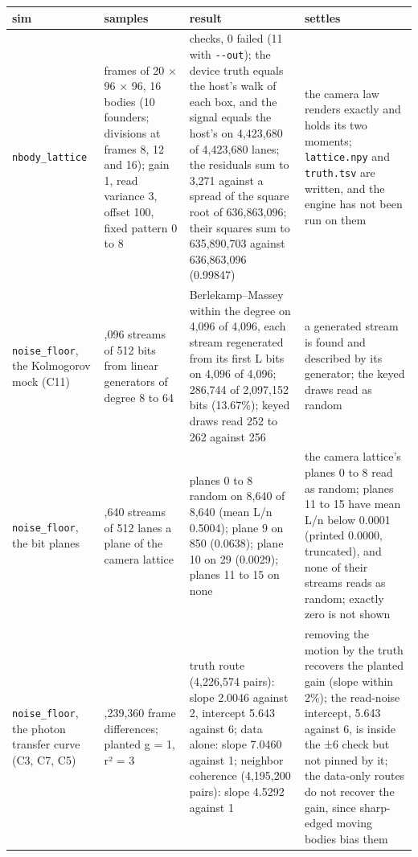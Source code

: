 {\footnotesize
\setlength{\tabcolsep}{6pt}
\begin{longtable}{>{\RaggedRight\arraybackslash}p{}>{\RaggedRight\arraybackslash}p{}>{\RaggedRight\arraybackslash}p{}>{\RaggedRight\arraybackslash}p{}}
\toprule
sim & samples & result & settles \\
\midrule
\endhead
\texttt{nbody\_\allowbreak{}lattice} & 24 frames of 20 × 96 × 96, 16 bodies (10 founders; divisions at frames 8, 12 and 16); gain 1, read variance 3, offset 100, fixed pattern 0 to 8 & 9 checks, 0 failed (11 with \texttt{-\allowbreak{}-\allowbreak{}out}); the device truth equals the host's walk of each box, and the signal equals the host's on 4,423,680 of 4,423,680 lanes; the residuals sum to 3,271 against a spread of the square root of 636,863,096; their squares sum to 635,890,703 against 636,863,096 (0.99847) & the camera law renders exactly and holds its two moments; \texttt{lattice.\allowbreak{}npy} and \texttt{truth.\allowbreak{}tsv} are written, and the engine has not been run on them \\
\texttt{noise\_\allowbreak{}floor}, the Kolmogorov mock (C11) & 4,096 streams of 512 bits from linear generators of degree 8 to 64 & Berlekamp–Massey within the degree on 4,096 of 4,096, each stream regenerated from its first L bits on 4,096 of 4,096; 286,744 of 2,097,152 bits (13.67\%); keyed draws read 252 to 262 against 256 & a generated stream is found and described by its generator; the keyed draws read as random \\
\texttt{noise\_\allowbreak{}floor}, the bit planes & 8,640 streams of 512 lanes a plane of the camera lattice & planes 0 to 8 random on 8,640 of 8,640 (mean L/n 0.5004); plane 9 on 850 (0.0638); plane 10 on 29 (0.0029); planes 11 to 15 on none & the camera lattice's planes 0 to 8 read as random; planes 11 to 15 have mean L/n below 0.0001 (printed 0.0000, truncated), and none of their streams reads as random; exactly zero is not shown \\
\texttt{noise\_\allowbreak{}floor}, the photon transfer curve (C3, C7, C5) & 4,239,360 frame differences; planted g = 1, r² = 3 & truth route (4,226,574 pairs): slope 2.0046 against 2, intercept 5.643 against 6; data alone: slope 7.0460 against 1; neighbor coherence (4,195,200 pairs): slope 4.5292 against 1 & removing the motion by the truth recovers the planted gain (slope within 2\%); the read-noise intercept, 5.643 against 6, is inside the ±6 check but not pinned by it; the data-only routes do not recover the gain, since sharp-edged moving bodies bias them \\

\end{longtable}}
